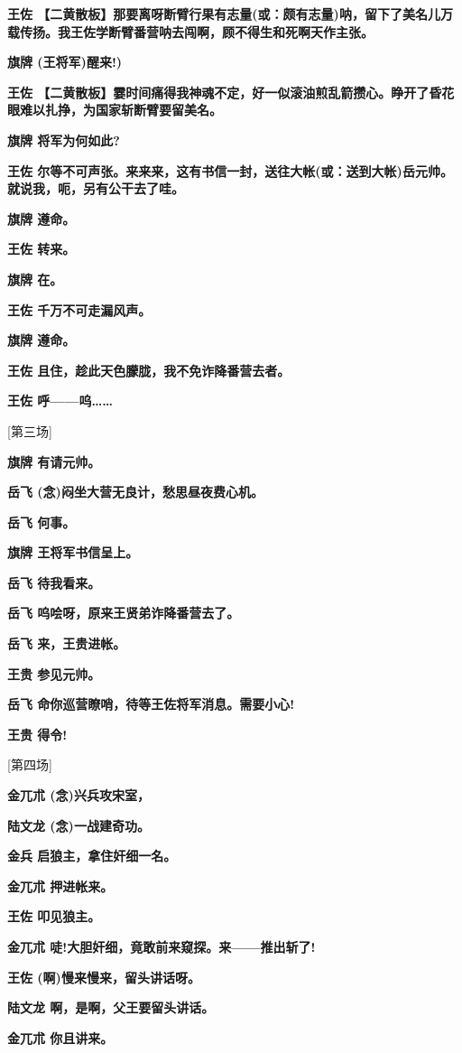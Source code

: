 \textbf{王佐
【二黄散板】那要离呀断臂行果有志量(或：颇有志量)呐，留下了美名儿万载传扬。我王佐学断臂番营呐去闯啊，顾不得生和死啊天作主张。}

\textbf{旗牌 (王将军)醒来!)}

\textbf{王佐
【二黄散板】霎时间痛得我神魂不定，好一似滚油煎乱箭攒心。睁开了昏花眼难以扎挣，为国家斩断臂要留美名。}

\textbf{旗牌 将军为何如此?}

\textbf{王佐
尔等不可声张。来来来，这有书信一封，送往大帐(或：送到大帐)岳元帅。就说我，呃，另有公干去了哇。}

\textbf{旗牌 遵命。}

\textbf{王佐 转来。}

\textbf{旗牌 在。}

\textbf{王佐 千万不可走漏风声。}

\textbf{旗牌 遵命。}

\textbf{王佐 且住，趁此天色朦胧，我不免诈降番营去者。}

\textbf{王佐 呼------呜\ldots{}\ldots{}}

{[}第三场{]}

\textbf{旗牌 有请元帅。}

\textbf{岳飞 (念)闷坐大营无良计，愁思昼夜费心机。}

\textbf{岳飞 何事。}

\textbf{旗牌 王将军书信呈上。}

\textbf{岳飞 待我看来。}

\textbf{岳飞 呜哙呀，原来王贤弟诈降番营去了。}

\textbf{岳飞 来，王贵进帐。}

\textbf{王贵 参见元帅。}

\textbf{岳飞 命你巡营瞭哨，待等王佐将军消息。需要小心!}

\textbf{王贵 得令!}

{[}第四场{]}

\textbf{金兀朮 (念)兴兵攻宋室，}

\textbf{陆文龙 (念)一战建奇功。}

\textbf{金兵 启狼主，拿住奸细一名。}

\textbf{金兀朮 押进帐来。}

\textbf{王佐 叩见狼主。}

\textbf{金兀朮 唗!大胆奸细，竟敢前来窥探。来------推出斩了!}

\textbf{王佐 (啊)慢来慢来，留头讲话呀。}

\textbf{陆文龙 啊，是啊，父王要留头讲话。}

\textbf{金兀朮 你且讲来。}

